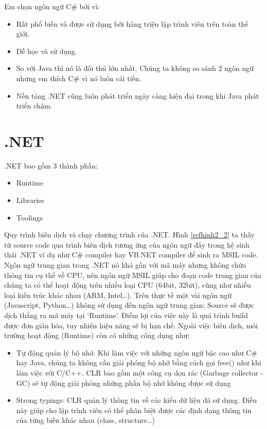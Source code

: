 \par
Em chọn ngôn ngữ C\# bởi vì:
\begin{itemize}
\item Rất phổ biến và được sử dụng bởi hàng triệu lập trình viên trên toàn thế giới.
\item Dễ học và sử dụng.
\item So với Java thì nó là đối thủ lớn nhất. Chúng ta không so sánh 2 ngôn ngữ nhưng em thích C\# vì nó luôn cải tiến.
\item Nền tảng .NET cũng luôn phát triển ngày càng hiện đại trong khi Java phát triển chậm.
\end{itemize}

\section{.NET}
.NET bao gồm 3 thành phần:
\begin{itemize}
\item Runtime
\item Libraries
\item Toolings
\end{itemize}
\par
Quy trình biên dịch và chạy chương trình của .NET. Hình \ref{refhinh2_2} ta thấy từ source code qua trình biên dịch tương ứng của ngôn ngữ đấy trong hệ sinh thái .NET ví dụ như C\# compiler hay VB.NET compiler để sinh ra MSIL code.  Ngôn ngữ trung gian trong .NET nó khá gần với mã máy nhưng không chứa thông tin cụ thể về CPU, nên ngôn ngữ MSIL giúp cho đoạn code trung gian của chúng ta có thể hoạt động trên nhiều loại CPU (64bit, 32bit), cũng như nhiều loại kiến trúc khác nhau (ARM, Intel…). Trên thực tế một vài ngôn ngữ (Javascript, Python…) không sử dụng đến ngôn ngữ trung gian: Source sẽ được dịch thẳng ra mã máy tại ‘Runtime’. Điểm lợi của việc này là quá trình build được đơn giản hóa, tuy nhiên hiệu năng sẽ bị hạn chế.
Ngoài việc biên dịch, môi trường hoạt động (Runtime) còn có những công dụng như:
\begin{itemize}
\item Tự động quản lý bộ nhớ. Khi làm việc với những ngôn ngữ bậc cao như C\# hay Java, chúng ta không cần  giải phóng bộ nhớ bằng cách gọi free() như khi làm việc với C/C++. CLR bao gồm một công cụ dọn rác (Garbage collector -GC) sẽ tự động giải phóng những phần bộ nhớ không được sử dụng
\item Strong typings: CLR quản lý thông tin về các kiểu dữ liệu đã sử dụng. Điều này giúp cho lập trình viên có thể phân biệt được các định dạng thông tin của từng biến khác nhau (class, structure…)
\end{itemize}
